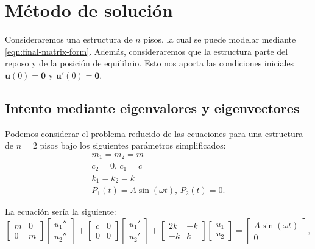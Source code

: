 \section{Método de solución}

Consideraremos una estructura de \(n\) pisos, la cual se puede modelar mediante \eqref{eqn:final-matrix-form}. Además, consideraremos que la estructura parte del reposo y de la posición de equilibrio. Esto nos aporta las condiciones iniciales \(\mathbf{u}(0) = \mathbf{0}\) y \(\mathbf{u}'(0) = \mathbf{0}\).

\subsection{Intento mediante eigenvalores y eigenvectores}

Podemos considerar el problema reducido de las ecuaciones para una estructura de \(n = 2\) pisos bajo los siguientes parámetros simplificados:
\begin{gather}
	m_1 = m_2 = m \\
	c_2 = 0, \, c_1 = c \\
	k_1 = k_2 = k \\
	P_1(t) = A\sin(\omega t), \, P_2(t) = 0
.\end{gather}

La ecuación sería la siguiente:
\[
	\begin{bmatrix}
    	m & 0 \\
    	0 & m
	\end{bmatrix} \begin{bmatrix} u_1'' \\ u_2'' \end{bmatrix}
	+ \begin{bmatrix}
    	c & 0 \\
    	0 & 0
	\end{bmatrix} \begin{bmatrix} u_1' \\ u_2' \end{bmatrix}
	+ \begin{bmatrix}
    	2k & -k \\
    	-k & k
	\end{bmatrix} \begin{bmatrix} u_1 \\ u_2 \end{bmatrix}
	= \begin{bmatrix} A\sin(\omega t) \\ 0 \end{bmatrix}
,\]

